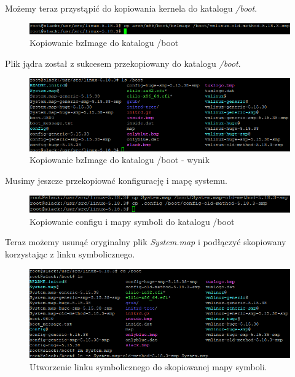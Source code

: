 \documentclass[a4paper,12pt,oneside]{book} %
\begin{document}
Możemy teraz przystąpić do kopiowania kernela do katalogu \emph{/boot}.

\begin{figure}[h]
	\centering
	\includegraphics[scale=0.6]{14-bzimage-copy}
	\caption{Kopiowanie bzImage do katalogu /boot}
\end{figure}

\pagebreak

Plik jądra został z sukcesem przekopiowany do katalogu \emph{/boot}.

\begin{figure}[h]
	\centering
	\includegraphics[scale=0.6]{15-boot}
	\caption{Kopiowanie bzImage do katalogu /boot - wynik}
\end{figure}

Musimy jeszcze przekopiować konfigurację i mapę systemu.

\begin{figure}[h]
	\centering
	\includegraphics[scale=0.6]{16-config-copy}
	\caption{Kopiowanie configu i mapy symboli do katalogu /boot}
\end{figure}

Teraz możemy usunąć oryginalny plik \emph{System.map} i podłączyć skopiowany korzystając z linku symbolicznego.

\begin{figure}[h]
	\centering
	\includegraphics[scale=0.6]{17-system-map-link}
	\caption{Utworzenie linku symbolicznego do skopiowanej mapy symboli.}
\end{figure}
\end{document}
